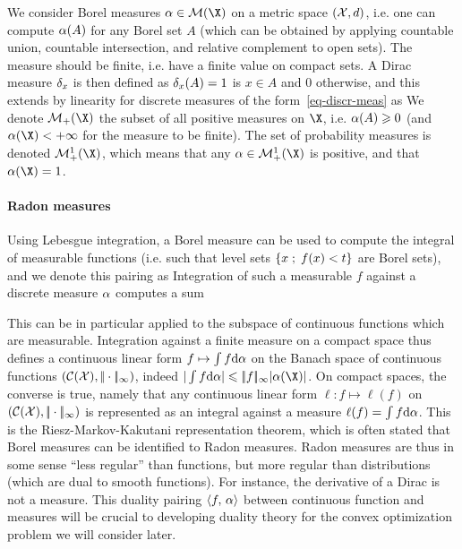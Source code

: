 We consider Borel measures $\al \in \Mm(\X)$ on a metric space $(\mathcal{X},d)$, i.e. one can compute $\alpha(A)$ for any Borel set $A$ (which can be obtained by applying countable union, countable intersection, and relative complement to open sets). The measure should be finite, i.e. have a finite value on compact sets.
%
A Dirac measure $\delta_x$ is then defined as $\delta_x(A)=1$ is $x \in A$ and $0$ otherwise, and this extends by linearity for discrete measures of the form~\eqref{eq-discr-meas} as
%
We denote $\Mm_+(\X)$ the subset of all positive measures on $\X$, i.e. $\alpha(A) \geqslant 0$ (and $\al(\X)<+\infty$ for the measure to be finite). The set of probability measures is denoted $\Mm_+^1(\X)$, which means that any $\al \in \Mm_+^1(\X)$ is positive, and that $\al(\X)=1$. 


\paragraph{Radon measures}

Using Lebesgue integration, a Borel measure can be used to compute the integral of measurable functions (i.e. such that level sets $\left\{ x \;;\; f(x) < t \right\}$ are Borel sets), and we denote this pairing as
Integration of such a measurable $f$ against a discrete measure $\alpha$ computes a sum

 
This can be in particular applied to the subspace of continuous functions which are measurable.
%
Integration against a finite measure on a compact space thus defines a continuous linear form $f \mapsto \int f \mathrm{d}\alpha$ on the Banach space of continuous functions $(\mathcal{C}(\mathcal{X}),|\!| \cdot |\!|_\infty)$, indeed $|\int f \d\al| \leq \norm{f}_\infty |\al(\X)|$. 
%
On compact spaces, the converse is true, namely that any continuous linear form $\ell : f \mapsto \ell(f)$ on $(\mathcal{C}(\mathcal{X}),|\!| \cdot |\!|_\infty)$ is represented as an integral against a measure $\ell(f)=\int f \mathrm{d} \alpha$. This is the  Riesz-Markov-Kakutani representation theorem, which is often stated that Borel measures can be identified to Radon measures.
%
Radon measures are thus in some sense ``less regular'' than functions, but more regular than distributions (which are dual to smooth functions). For instance, the derivative of a Dirac is not a measure.
%
This duality pairing $\langle f,\,\alpha\rangle$ between continuous function and measures will be crucial to developing duality theory for the convex optimization problem we will consider later. 

